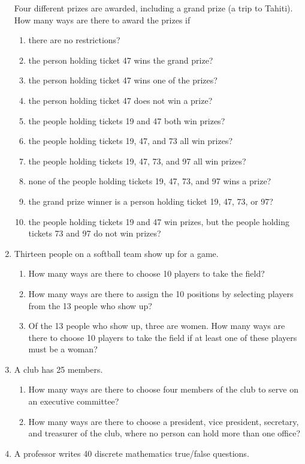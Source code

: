 \documentclass[11pt,a4paper]{book}
\begin{document}
\begin{enumerate}
Four different prizes are awarded, including a grand prize (a trip to Tahiti).
How many ways are there to award the prizes if
\begin{enumerate}[label=(\alph*)]
\item there are no restrictions?
\item the person holding ticket 47 wins the grand prize?
\item the person holding ticket 47 wins one of the prizes?
\item the person holding ticket 47 does not win a prize?
\item the people holding tickets 19 and 47 both win prizes?
\item the people holding tickets 19, 47, and 73 all win prizes?
\item the people holding tickets 19, 47, 73, and 97 all win prizes?
\item none of the people holding tickets 19, 47, 73, and 97 wins a prize?
\item the grand prize winner is a person holding ticket 19, 47, 73, or 97?
\item the people holding tickets 19 and 47 win prizes, but the people holding tickets 73 and 97 do not win prizes?
\end{enumerate}
\item Thirteen people on a softball team show up for a game.
\begin{enumerate}[label=(\alph*)]
\item How many ways are there to choose 10 players to take the field?
\item How many ways are there to assign the 10 positions by selecting players from the 13 people who show up?
\item Of the 13 people who show up, three are women.
How many ways are there to choose 10 players to take the field if at least one of these players must be a woman?
\end{enumerate}
\item A club has 25 members.
\begin{enumerate}[label=(\alph*)]
\item How many ways are there to choose four members of the club to serve on an executive committee?
\item How many ways are there to choose a president, vice president, secretary, and treasurer of the club, where no person can hold more than one office?
\end{enumerate}
\item A professor writes 40 discrete mathematics true/false questions.

\end{enumerate}
\end{document}
